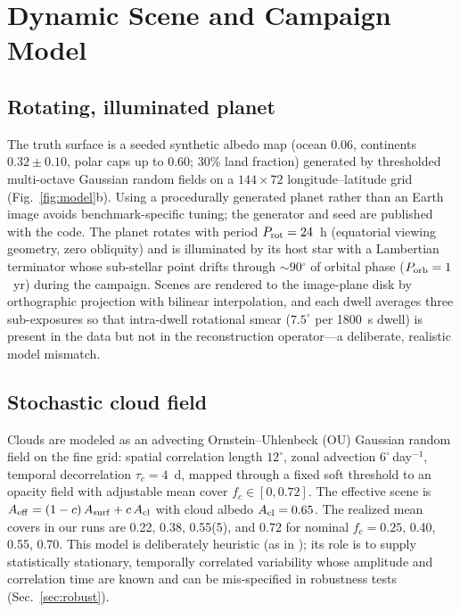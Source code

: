 ﻿\documentclass[twocolumn,10pt]{article}
\begin{document}
\section{Dynamic Scene and Campaign Model}
\label{sec:scene}

\subsection{Rotating, illuminated planet}
The truth surface is a seeded synthetic albedo map (ocean 0.06,
continents $0.32\pm0.10$, polar caps up to 0.60; 30\% land fraction)
generated by thresholded multi-octave Gaussian random fields on a
$144\times72$ longitude--latitude grid (Fig.~\ref{fig:model}b). Using a
procedurally generated planet rather than an Earth image avoids
benchmark-specific tuning; the generator and seed are published with the
code. The planet rotates with period $P_{\rm rot}=24$~h (equatorial
viewing geometry, zero obliquity) and is illuminated by its host star
with a Lambertian terminator whose sub-stellar point drifts through
$\sim$90$^\circ$ of orbital phase ($P_{\rm orb}=1$~yr) during the
campaign. Scenes are rendered to the image-plane disk by orthographic
projection with bilinear interpolation, and each dwell averages three
sub-exposures so that intra-dwell rotational smear ($7.5^\circ$ per
1800~s dwell) is present in the data but not in the reconstruction
operator---a deliberate, realistic model mismatch.

\subsection{Stochastic cloud field}
Clouds are modeled as an advecting Ornstein--Uhlenbeck (OU) Gaussian
random field on the fine grid: spatial correlation length
$12^\circ$, zonal advection $6^\circ$\,day$^{-1}$, temporal
decorrelation $\tau_c=4$~d, mapped through a fixed soft threshold to an
opacity field with adjustable mean cover $f_c\in[0,0.72]$. The
effective scene is $A_{\rm eff}=(1-c)\,A_{\rm surf}+c\,A_{\rm cl}$ with
cloud albedo $A_{\rm cl}=0.65$. The realized mean covers in our runs are
0.22, 0.38, 0.55(5), and 0.72 for nominal $f_c=0.25$, 0.40, 0.55, 0.70.
This model is deliberately heuristic (as in \citealt{toth25clouds});
its role is to supply statistically stationary, temporally correlated
variability whose amplitude and correlation time are known and can be
mis-specified in robustness tests (Sec.~\ref{sec:robust}).
\end{document}
